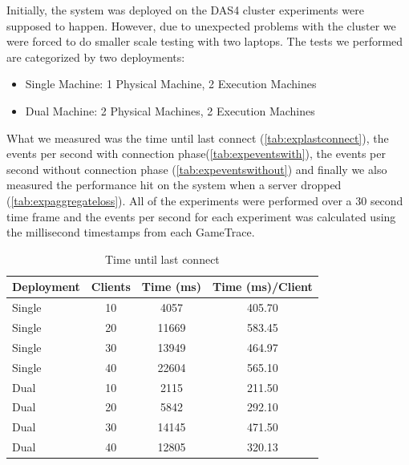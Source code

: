 \documentclass[a4paper,10pt]{article}
\begin{document}
Initially, the system was deployed on the DAS4 cluster experiments were supposed to happen.
However, due to unexpected problems with the cluster we were forced to do smaller scale testing with two laptops.
The tests we performed are categorized by two deployments: 

\begin{itemize}
\item Single Machine: 1 Physical Machine, 2 Execution Machines
\item Dual Machine: 2 Physical Machines, 2 Execution Machines
\end{itemize}

What we measured was the time until last connect (\autoref{tab:explastconnect}),
the events per second with connection phase(\autoref{tab:expeventswith}),
the events per second without connection phase (\autoref{tab:expeventswithout}) and 
finally we also measured the performance hit on the system when a server dropped (\autoref{tab:expaggregateloss}).
All of the experiments were performed over a 30 second time frame and the events per second for each experiment was calculated 
using the millisecond timestamps from each GameTrace.

\begin{table}
\centering
\begin{tabular}{| l | c | c | c |}
\hline
\textbf{Deployment} & \textbf{Clients} & \textbf{Time (ms)}  & \textbf{Time (ms)/Client} \\
\hline
\hline
Single & 10 & 4057 & 405.70\\
\hline
Single & 20 & 11669 &583.45 \\
\hline
Single & 30& 13949 & 464.97\\
\hline
Single & 40& 22604 & 565.10\\
\hline
\hline
Dual & 10 & 2115 &211.50 \\
\hline
Dual & 20 & 5842 &292.10 \\
\hline
Dual & 30 & 14145 &471.50 \\
\hline
Dual & 40 & 12805 &320.13 \\
\hline
\end{tabular}
\caption{Time until last connect}
\label{tab:explastconnect}
\end{table}
\end{document}

